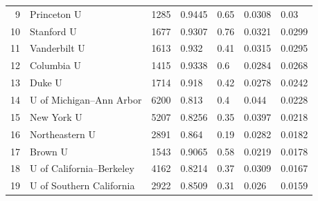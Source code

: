 \documentclass[12pt]{article}
\theoremstyle{definition}
\begin{document}
\begin{table}[]
\begin{tabular}{r|l|r|l|l|l|l}
9                                  & Princeton U                           & 1285                                 & 0.9445                  & 0.65           & 0.0308              & 0.03                                \\
10                                 & Stanford U                            & 1677                                 & 0.9307                  & 0.76           & 0.0321              & 0.0299                              \\
11                                 & Vanderbilt U                          & 1613                                 & 0.932                   & 0.41           & 0.0315              & 0.0295                              \\
12                                 & Columbia U    & 1415                                 & 0.9338                  & 0.6            & 0.0284              & 0.0268                              \\
13                                 & Duke U                                & 1714                                 & 0.918                   & 0.42           & 0.0278              & 0.0242                              \\
14                                 & U of Michigan--Ann Arbor               & 6200                                 & 0.813                   & 0.4            & 0.044               & 0.0228                              \\
15                                 & New York U                            & 5207                                 & 0.8256                  & 0.35           & 0.0397              & 0.0218                              \\
16                                 & Northeastern U                        & 2891                                 & 0.864                   & 0.19           & 0.0282              & 0.0182                              \\
17                                 & Brown U                               & 1543                                 & 0.9065                  & 0.58           & 0.0219              & 0.0178                              \\
18                                 & U of California--Berkeley              & 4162                                 & 0.8214                  & 0.37           & 0.0309              & 0.0167                              \\
19                                 & U of Southern California              & 2922                                 & 0.8509                  & 0.31           & 0.026               & 0.0159                              \\

\end{tabular}
\end{table}
\end{document}
